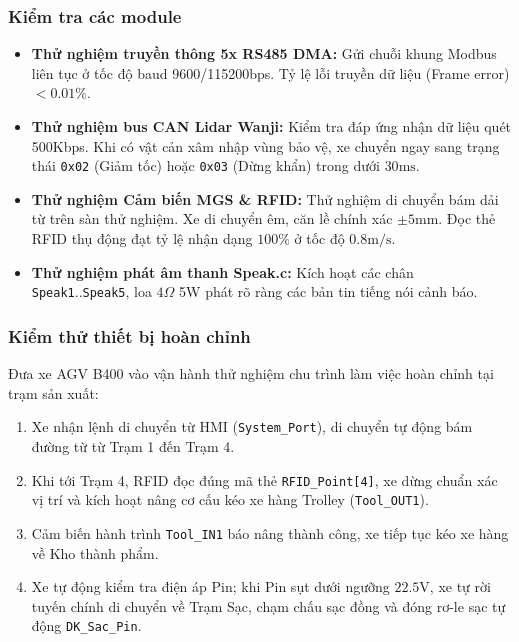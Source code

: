 \documentclass{article}
\begin{document}
\subsubsection{Kiểm tra các module}
\begin{itemize}
    \item \textbf{Thử nghiệm truyền thông 5x RS485 DMA:} Gửi chuỗi khung Modbus liên tục ở tốc độ baud 9600/115200bps. Tỷ lệ lỗi truyền dữ liệu (Frame error) $<0.01\%$.
    \item \textbf{Thử nghiệm bus CAN Lidar Wanji:} Kiểm tra đáp ứng nhận dữ liệu quét 500Kbps. Khi có vật cản xâm nhập vùng bảo vệ, xe chuyển ngay sang trạng thái \texttt{0x02} (Giảm tốc) hoặc \texttt{0x03} (Dừng khẩn) trong dưới $30\text{ms}$.
    \item \textbf{Thử nghiệm Cảm biến MGS \& RFID:} Thử nghiệm di chuyển bám dải từ trên sàn thử nghiệm. Xe di chuyển êm, căn lề chính xác $\pm 5\text{mm}$. Đọc thẻ RFID thụ động đạt tỷ lệ nhận dạng $100\%$ ở tốc độ $0.8\text{m/s}$.
    \item \textbf{Thử nghiệm phát âm thanh Speak.c:} Kích hoạt các chân \texttt{Speak1}..\texttt{Speak5}, loa $4\Omega$ 5W phát rõ ràng các bản tin tiếng nói cảnh báo.
\end{itemize}

\subsubsection{Kiểm thử thiết bị hoàn chỉnh}
Đưa xe AGV B400 vào vận hành thử nghiệm chu trình làm việc hoàn chỉnh tại trạm sản xuất:
\begin{enumerate}
    \item Xe nhận lệnh di chuyển từ HMI (\texttt{System\_Port}), di chuyển tự động bám đường từ từ Trạm 1 đến Trạm 4.
    \item Khi tới Trạm 4, RFID đọc đúng mã thẻ \texttt{RFID\_Point[4]}, xe dừng chuẩn xác vị trí và kích hoạt nâng cơ cấu kéo xe hàng Trolley (\texttt{Tool\_OUT1}).
    \item Cảm biến hành trình \texttt{Tool\_IN1} báo nâng thành công, xe tiếp tục kéo xe hàng về Kho thành phẩm.
    \item Xe tự động kiểm tra điện áp Pin; khi Pin sụt dưới ngưỡng $22.5\text{V}$, xe tự rời tuyến chính di chuyển về Trạm Sạc, chạm chấu sạc đồng và đóng rơ-le sạc tự động \texttt{DK\_Sac\_Pin}.
\end{enumerate}

\clearpage

\end{document}
